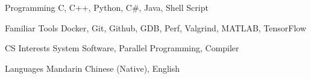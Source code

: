 

\begin{cvskills}

  \cvskill
    {Programming} %
    {C, C++, Python, C\#, Java, Shell Script} %

  \cvskill
    {Familiar Tools} %
    {Docker, Git, Github, GDB, Perf, Valgrind, MATLAB, TensorFlow} %

  \cvskill
    {CS Interests} %
    {System Software, Parallel Programming, Compiler} %

  \cvskill
    {Languages} %
    {Mandarin Chinese (Native), English} %

\end{cvskills}